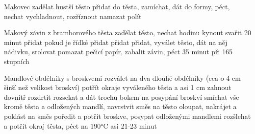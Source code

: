 \documentclass[12pt,a4paper]{article}
\begin{document}
\begin{recipe}{Makovec}
   zadělat hustší těsto
   přidat do těsta, zamíchat, dát do formy, péct, nechat vychladnout, rozříznout
   namazat
   polít
\end{recipe}
\newpage

\begin{recipe}{Makový závin z bramborového těsta}
   zadělat těsto, nechat hodinu kynout
   svařit 20 minut
   přidat pokud je řídké
   přidat
   přidat
   přidat, vyválet těsto, dát na něj nádivku, srolovat
   pomazat pečicí papír, zabalit závin, péct 35 minut při 165 stupních
\end{recipe}
\newpage

\begin{recipe}{Mandlové obdélníky s broskvemi}
   rozválet na dva dlouhé obdélníky (cca o 4 cm širší než velikost broskví)
   potřít okraje vyváleného těsta a asi 1 cm zahnout dovnitř
   rozdrtit
   rozsekat a dát trochu bokem na posypání broskví
   smíchat vše kromě těsta a odložených mandlí, navrstvit směs na těsto
   oloupat, nakrájet a poklást na směs
   poředit a potřít broskve, posypat odloženými mandlemi
   rozšlehat a potřít okraj těsta, péct na 190°C asi 21-23 minut
\end{recipe}
\newpage
\end{document}
